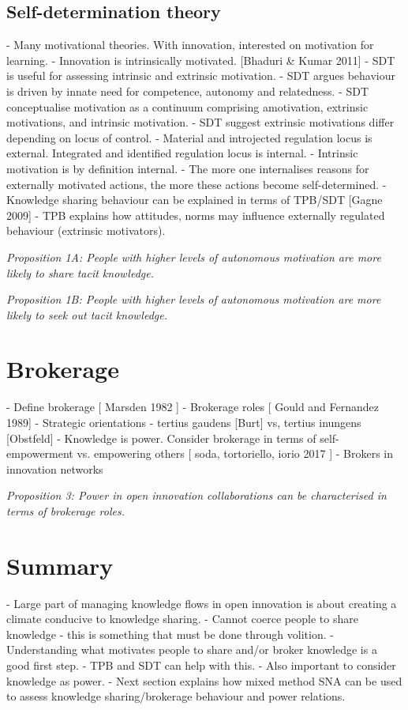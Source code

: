 \subsection{Self-determination theory}
 
 
- Many motivational theories. With innovation, interested on motivation for learning.
- Innovation is intrinsically motivated. [Bhaduri & Kumar 2011]
- SDT is useful for assessing intrinsic and extrinsic motivation.
- SDT argues behaviour is driven by innate need for competence, autonomy and relatedness.
- SDT conceptualise motivation as a continuum comprising amotivation, extrinsic motivations, and intrinsic motivation.
- SDT suggest extrinsic motivations differ depending on locus of control.
- Material and introjected regulation locus is external. Integrated and identified regulation locus is internal.
- Intrinsic motivation is by definition internal.
- The more one internalises reasons for externally motivated actions, the more these actions become self-determined.
- Knowledge sharing behaviour can be explained in terms of TPB/SDT [Gagne 2009]
- TPB explains how attitudes, norms may influence externally regulated behaviour (extrinsic motivators).
 
\emph{Proposition 1A: People with higher levels of autonomous motivation are more likely to share tacit knowledge.}

\emph{Proposition 1B: People with higher levels of autonomous motivation are more likely to seek out tacit knowledge.}
 
 
\section{Brokerage}
 
- Define brokerage [ Marsden 1982 ]
- Brokerage roles [ Gould and Fernandez 1989]
- Strategic orientations - tertius gaudens [Burt] vs, tertius inungens [Obstfeld]
- Knowledge is power. Consider brokerage in terms of self-empowerment vs. empowering others [ soda, tortoriello, iorio 2017 ]
- Brokers in innovation networks
 
\emph{Proposition 3: Power in open innovation collaborations can be characterised in terms of brokerage roles.}
 
\section{Summary}
 
- Large part of managing knowledge flows in open innovation is about creating a climate conducive to knowledge sharing.
- Cannot coerce people to share knowledge - this is something that must be done through volition.
- Understanding what motivates people to share and/or broker knowledge is a good first step.
- TPB and SDT can help with this.
- Also important to consider knowledge as power.
- Next section explains how mixed method SNA can be used to assess knowledge sharing/brokerage behaviour and power relations. 